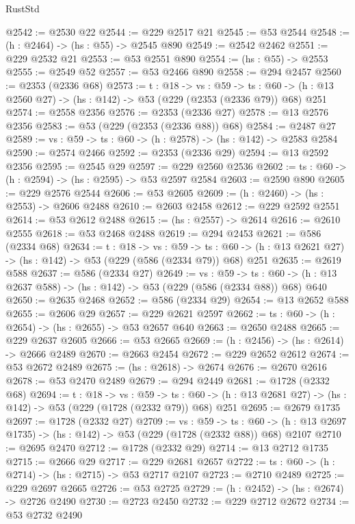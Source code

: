 \begin{lexlean}{RustStd}
\begin{coremodule}
@2542 := @2530 @22
@2544 := @229 @2517 @21
@2545 := @53 @2544
@2548 := (h : @2464) -> (hs : @55) -> @2545 @890
@2549 := @2542 @2462
@2551 := @229 @2532 @21
@2553 := @53 @2551 @890
@2554 := (hs : @55) -> @2553
@2555 := @2549 @52
@2557 := @53 @2466 @890
@2558 := @294 @2457
@2560 := @2353 (@2336 @68)
@2573 := {t : @18} ->
  {vs : @59} ->
  {ts : @60} -> (h : @13 @2560 @27) -> (hs : @142) -> @53 (@229 (@2353 (@2336 @79)) @68) @251
@2574 := @2558 @2356
@2576 := @2353 (@2336 @27)
@2578 := @13 @2576 @2356
@2583 := @53 (@229 (@2353 (@2336 @88)) @68)
@2584 := @2487 @27
@2589 := {vs : @59} -> {ts : @60} -> (h : @2578) -> (hs : @142) -> @2583 @2584
@2590 := @2574 @2466
@2592 := @2353 (@2336 @29)
@2594 := @13 @2592 @2356
@2595 := @2545 @29
@2597 := @229 @2560 @2536
@2602 := {ts : @60} -> (h : @2594) -> (hs : @2595) -> @53 @2597 @2584
@2603 := @2590 @890
@2605 := @229 @2576 @2544
@2606 := @53 @2605
@2609 := (h : @2460) -> (hs : @2553) -> @2606 @2488
@2610 := @2603 @2458
@2612 := @229 @2592 @2551
@2614 := @53 @2612 @2488
@2615 := (hs : @2557) -> @2614
@2616 := @2610 @2555
@2618 := @53 @2468 @2488
@2619 := @294 @2453
@2621 := @586 (@2334 @68)
@2634 := {t : @18} ->
  {vs : @59} ->
  {ts : @60} -> (h : @13 @2621 @27) -> (hs : @142) -> @53 (@229 (@586 (@2334 @79)) @68) @251
@2635 := @2619 @588
@2637 := @586 (@2334 @27)
@2649 := {vs : @59} ->
  {ts : @60} -> (h : @13 @2637 @588) -> (hs : @142) -> @53 (@229 (@586 (@2334 @88)) @68) @640
@2650 := @2635 @2468
@2652 := @586 (@2334 @29)
@2654 := @13 @2652 @588
@2655 := @2606 @29
@2657 := @229 @2621 @2597
@2662 := {ts : @60} -> (h : @2654) -> (hs : @2655) -> @53 @2657 @640
@2663 := @2650 @2488
@2665 := @229 @2637 @2605
@2666 := @53 @2665
@2669 := (h : @2456) -> (hs : @2614) -> @2666 @2489
@2670 := @2663 @2454
@2672 := @229 @2652 @2612
@2674 := @53 @2672 @2489
@2675 := (hs : @2618) -> @2674
@2676 := @2670 @2616
@2678 := @53 @2470 @2489
@2679 := @294 @2449
@2681 := @1728 (@2332 @68)
@2694 := {t : @18} ->
  {vs : @59} ->
  {ts : @60} -> (h : @13 @2681 @27) -> (hs : @142) -> @53 (@229 (@1728 (@2332 @79)) @68) @251
@2695 := @2679 @1735
@2697 := @1728 (@2332 @27)
@2709 := {vs : @59} ->
  {ts : @60} -> (h : @13 @2697 @1735) -> (hs : @142) -> @53 (@229 (@1728 (@2332 @88)) @68) @2107
@2710 := @2695 @2470
@2712 := @1728 (@2332 @29)
@2714 := @13 @2712 @1735
@2715 := @2666 @29
@2717 := @229 @2681 @2657
@2722 := {ts : @60} -> (h : @2714) -> (hs : @2715) -> @53 @2717 @2107
@2723 := @2710 @2489
@2725 := @229 @2697 @2665
@2726 := @53 @2725
@2729 := (h : @2452) -> (hs : @2674) -> @2726 @2490
@2730 := @2723 @2450
@2732 := @229 @2712 @2672
@2734 := @53 @2732 @2490

\end{coremodule}
\end{lexlean}
